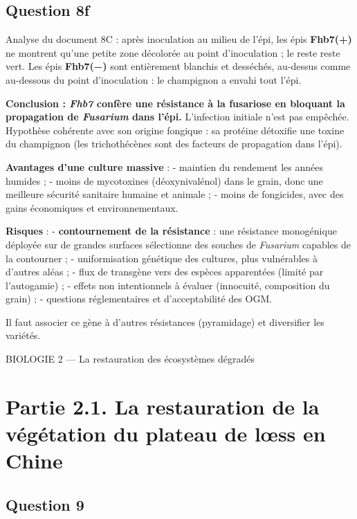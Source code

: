 \documentclass[11pt,a4paper]{article}
\begin{document}
\hypertarget{question-8f}{%
\subsection{Question 8f}\label{question-8f}}

Analyse du document 8C : après inoculation au milieu de l'épi, les épis \textbf{Fhb7(+)} ne montrent qu'une petite zone décolorée au point d'inoculation ; le reste reste vert. Les épis \textbf{Fhb7(−)} sont entièrement blanchis et desséchés, au-dessus comme au-dessous du point d'inoculation : le champignon a envahi tout l'épi.

\textbf{Conclusion : \emph{Fhb7} confère une résistance à la fusariose en bloquant la propagation de \emph{Fusarium} dans l'épi.} L'infection initiale n'est pas empêchée. Hypothèse cohérente avec son origine fongique : sa protéine détoxifie une toxine du champignon (les trichothécènes sont des facteurs de propagation dans l'épi).

\textbf{Avantages d'une culture massive} :
- maintien du rendement les années humides ;
- moins de mycotoxines (déoxynivalénol) dans le grain, donc une meilleure sécurité sanitaire humaine et animale ;
- moins de fongicides, avec des gains économiques et environnementaux.

\textbf{Risques} :
- \textbf{contournement de la résistance} : une résistance monogénique déployée sur de grandes surfaces sélectionne des souches de \emph{Fusarium} capables de la contourner ;
- uniformisation génétique des cultures, plus vulnérables à d'autres aléas ;
- flux de transgène vers des espèces apparentées (limité par l'autogamie) ;
- effets non intentionnels à évaluer (innocuité, composition du grain) ;
- questions réglementaires et d'acceptabilité des OGM.

Il faut associer ce gène à d'autres résistances (pyramidage) et diversifier les variétés.

BIOLOGIE 2 --- La restauration des écosystèmes dégradés

\hypertarget{partie-2.1.-la-restauration-de-la-vuxe9guxe9tation-du-plateau-de-lux153ss-en-chine}{%
\section{Partie 2.1. La restauration de la végétation du plateau de lœss en Chine}\label{partie-2.1.-la-restauration-de-la-vuxe9guxe9tation-du-plateau-de-lux153ss-en-chine}}

\hypertarget{question-9}{%
\subsection{Question 9}\label{question-9}}
\end{document}
